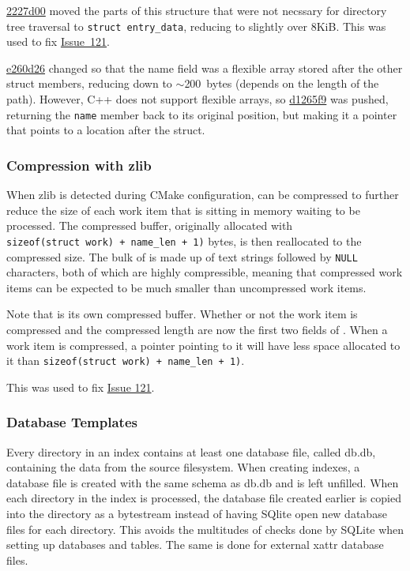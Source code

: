 \href{https://github.com/mar-file-system/GUFI/commit/2227d00665eb6d507ac2052e80616c077a5da853}{2227d00}
moved the parts of this structure that were not necssary for directory
tree traversal to \texttt{struct~entry\_data}, reducing
\work to slightly over 8KiB. This was used to fix
\href{https://github.com/mar-file-system/GUFI/issues/121}{Issue~121}.

\href{https://github.com/mar-file-system/GUFI/commit/e260d26aab0713835defbe2a5b6e1187610dcf3d}{e260d26}
changed \work so that the name field was a flexible
array stored after the other struct members, reducing
\work down to $\sim$200~bytes (depends on the length of the
path). However, C++ does not support flexible arrays, so
\href{https://github.com/mar-file-system/GUFI/commit/d1265f9ee9a5aa4451400f5abb455eb3ad64957c}{d1265f9}
was pushed, returning the \texttt{name} member back to its original
position, but making it a pointer that points to a location after the
struct.

\subsubsection{Compression with zlib}
When zlib is detected during CMake configuration, \work can be
compressed to further reduce the size of each work item that is
sitting in memory waiting to be processed. The compressed buffer,
originally allocated with
\texttt{sizeof(struct~work)~+~name\_len~+~1)} bytes, is then
reallocated to the compressed size. The bulk of \work is made up of
text strings followed by \texttt{NULL} characters, both of which are
highly compressible, meaning that compressed work items can be
expected to be much smaller than uncompressed work items.

Note that \work is its own compressed buffer. Whether
or not the work item is compressed and the compressed length are now
the first two fields of \work. When a work item is
compressed, a pointer pointing to it will have less space allocated to
it than \texttt{sizeof(struct~work)~+~name\_len~+~1)}.

This was used to fix
\href{https://github.com/mar-file-system/GUFI/issues/121}{Issue 121}.

\subsubsection{Database Templates}
Every directory in an index contains at least one database file,
called db.db, containing the \lstat data from the source
filesystem. When creating indexes, a database file is created with
the same schema as db.db and is left unfilled. When each directory in
the index is processed, the database file created earlier is copied
into the directory as a bytestream instead of having SQlite open new
database files for each directory. This avoids the multitudes of
checks done by SQLite when setting up databases and tables. The same
is done for external xattr database files.

